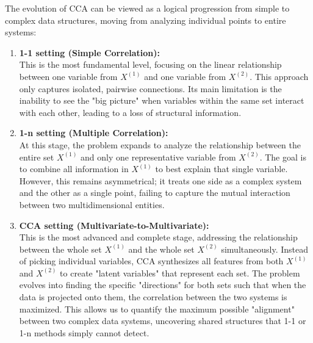 The evolution of CCA can be viewed as a logical progression from simple to complex data structures, moving from analyzing individual points to entire systems:

\begin{enumerate} [leftmargin=1.8em, label=\textbf{(\arabic*)}]
    \item \textbf{1-1 setting (Simple Correlation):} \\
    This is the most fundamental level, focusing on the linear relationship between one variable from $X^{(1)}$ and one variable from $X^{(2)}$. This approach only captures isolated, pairwise connections. Its main limitation is the inability to see the "big picture" when variables within the same set interact with each other, leading to a loss of structural information.

    \item \textbf{1-n setting (Multiple Correlation):} \\
    At this stage, the problem expands to analyze the relationship between the entire set $X^{(1)}$ and only one representative variable from $X^{(2)}$. The goal is to combine all information in $X^{(1)}$ to best explain that single variable. However, this remains asymmetrical; it treats one side as a complex system and the other as a single point, failing to capture the mutual interaction between two multidimensional entities.

    \item \textbf{CCA setting (Multivariate-to-Multivariate):} \\
    This is the most advanced and complete stage, addressing the relationship between the whole set $X^{(1)}$ and the whole set $X^{(2)}$ simultaneously. Instead of picking individual variables, CCA synthesizes all features from both $X^{(1)}$ and $X^{(2)}$ to create "latent variables" that represent each set. The problem evolves into finding the specific "directions" for both sets such that when the data is projected onto them, the correlation between the two systems is maximized. This allows us to quantify the maximum possible "alignment" between two complex data systems, uncovering shared structures that 1-1 or 1-n methods simply cannot detect.
\end{enumerate}



